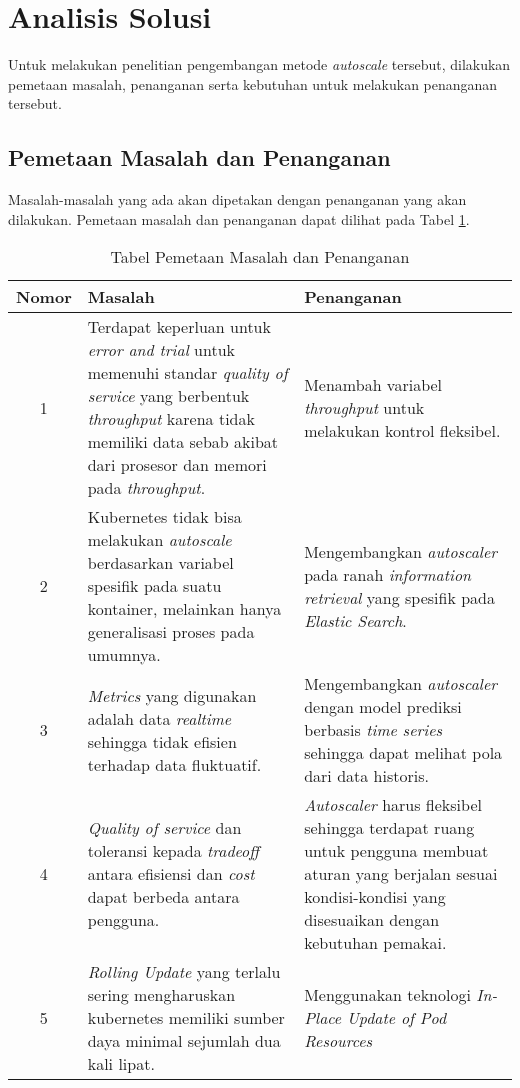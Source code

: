 \section{Analisis Solusi}

Untuk melakukan penelitian pengembangan metode \textit{autoscale} tersebut, dilakukan pemetaan masalah, penanganan serta kebutuhan untuk melakukan penanganan tersebut.

\subsection{Pemetaan Masalah dan Penanganan}
\label{sec:pemetaan-masalah}
Masalah-masalah yang ada akan dipetakan dengan penanganan yang akan dilakukan. Pemetaan masalah dan penanganan dapat dilihat pada Tabel \ref{tab:pemetaan-masalah}.

\begin{table}[h]
    \caption{Tabel Pemetaan Masalah dan Penanganan}
    \vspace{0.25cm}
    \begin{center}
        \begin{tabular}{|c|p{2.5in}|p{2.5in}|}
            \rowcolor{gray!30}
            \hline
            \textbf{Nomor} & \textbf{Masalah} & \textbf{Penanganan} \tabularnewline
            \hline
            1 & Terdapat keperluan untuk \textit{error and trial} untuk memenuhi standar \textit{quality of service} yang berbentuk \textit{throughput} karena tidak memiliki data sebab akibat dari prosesor dan memori pada \textit{throughput}. &
            Menambah variabel \textit{throughput} untuk melakukan kontrol fleksibel.
            \tabularnewline

            2 &
            Kubernetes tidak bisa melakukan \textit{autoscale} berdasarkan variabel spesifik pada suatu kontainer, melainkan hanya generalisasi proses pada umumnya. &
            Mengembangkan \textit{autoscaler} pada ranah \textit{information retrieval} yang spesifik pada \textit{Elastic Search}. \tabularnewline

            3 &
            \textit{Metrics} yang digunakan adalah data \textit{realtime} sehingga tidak efisien terhadap data fluktuatif. &
            Mengembangkan \textit{autoscaler} dengan model prediksi berbasis \textit{time series} sehingga dapat melihat pola dari data historis.\tabularnewline

            4 & \textit{Quality of service} dan toleransi kepada \textit{tradeoff} antara efisiensi dan \textit{cost} dapat berbeda antara pengguna. &
            \textit{Autoscaler} harus fleksibel sehingga terdapat ruang untuk pengguna membuat aturan yang berjalan sesuai kondisi-kondisi yang disesuaikan dengan kebutuhan pemakai.\tabularnewline

            5 & \textit{Rolling Update} yang terlalu sering mengharuskan kubernetes memiliki sumber daya minimal sejumlah dua kali lipat. &
            Menggunakan teknologi \textit{In-Place Update of Pod Resources} \tabularnewline
            \hline
        \end{tabular}
    \end{center}
    \label{tab:pemetaan-masalah}
\end{table}